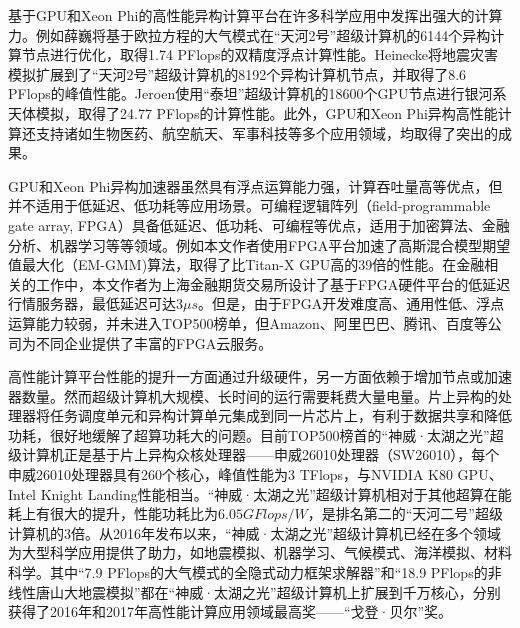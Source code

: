 基于GPU和Xeon Phi的高性能异构计算平台在许多科学应用中发挥出强大的计算力。例如薛巍将基于欧拉方程的大气模式在“天河2号”超级计算机的6144个异构计算节点进行优化，取得1.74 PFlops的双精度浮点计算性能\cite{xue2015ultra}。Heinecke将地震灾害模拟扩展到了“天河2号”超级计算机的8192个异构计算机节点，并取得了8.6 PFlops的峰值性能\cite{heinecke2014petascale}。Jeroen使用“泰坦”超级计算机的18600个GPU节点进行银河系天体模拟，取得了24.77 PFlops的计算性能\cite{bedorf201424}。此外，GPU和Xeon Phi异构高性能计算还支持诸如生物医药\cite{tumeo2010accelerating,chen2008gpu}、航空航天\cite{habib2012universe,kampolis2010cfd}、军事科技\cite{ariga2014fast,fronckowiak2009using}等多个应用领域，均取得了突出的成果。

GPU和Xeon Phi异构加速器虽然具有浮点运算能力强，计算吞吐量高等优点，但并不适用于低延迟、低功耗等应用场景。可编程逻辑阵列（field-programmable gate array, FPGA）具备低延迟、低功耗、可编程等优点，适用于加密算法\cite{elbirt2000fpga,elbirt2000fpga,hauser1997garp}、金融分析\cite{zhang2005reconfigurable,jin2013optimising,tse2010reconfigurable,becker2015maxeler}、机器学习\cite{irick2008hardware,zhang2015optimizing,wang2017dlau}等等领域。例如本文作者使用FPGA平台加速了高斯混合模型期望值最大化（EM-GMM)算法，取得了比Titan-X GPU高的39倍的性能\cite{he2017fully}。在金融相关的工作中，本文作者为上海金融期货交易所设计了基于FPGA硬件平台的低延迟行情服务器\cite{fu2017nanosecond,he2017exploring,fu2017accelerating}，最低延迟可达$3\mu s$。但是，由于FPGA开发难度高、通用性低、浮点运算能力较弱，并未进入TOP500榜单，但Amazon、阿里巴巴、腾讯、百度等公司为不同企业提供了丰富的FPGA云服务\cite{tarafdar2018designing}。

高性能计算平台性能的提升一方面通过升级硬件，另一方面依赖于增加节点或加速器数量。然而超级计算机大规模、长时间的运行需要耗费大量电量\cite{reed2015exascale}。片上异构的处理器将任务调度单元和异构计算单元集成到同一片芯片上，有利于数据共享和降低功耗，很好地缓解了超算功耗大的问题。目前TOP500榜首的“神威·太湖之光”超级计算机正是基于片上异构众核处理器\cite{fu2016sunway}——申威26010处理器（SW26010），每个申威26010处理器具有260个核心，峰值性能为3 TFlops，与NVIDIA K80 GPU、Intel Knight Landing性能相当\cite{einkemmer2017evaluation,sodani2016knights}。“神威·太湖之光”超级计算机相对于其他超算在能耗上有很大的提升，性能功耗比为$6.05GFlops/W$，是排名第二的“天河二号”超级计算机的3倍。从2016年发布以来，“神威·太湖之光”超级计算机已经在多个领域为大型科学应用提供了助力，如地震模拟\cite{fu201718}、机器学习\cite{fang2017swdnn}、气候模式\cite{yang201610m,fu2016refactoring}、海洋模拟\cite{qiao2016highly}、材料科学\cite{zhang2016extreme}。其中“7.9 PFlops的大气模式的全隐式动力框架求解器”和“18.9 PFlops的非线性唐山大地震模拟”都在“神威·太湖之光”超级计算机上扩展到千万核心，分别获得了2016年和2017年高性能计算应用领域最高奖——“戈登·贝尔”奖。

